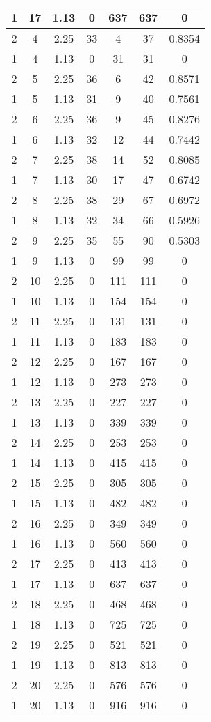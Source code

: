 \documentclass[letterpaper, 12pt]{article}
\begin{document}
\begin{longtable}{|c|c|c|c|c|c|c|}
1 & 17 & 1.13 & 0 & 637 & 637 & 0 \\
\hline
2 & 4 & 2.25 & 33 & 4 & 37 & 0.8354 \\
\hline
1 & 4 & 1.13 & 0 & 31 & 31 & 0 \\
\hline
2 & 5 & 2.25 & 36 & 6 & 42 & 0.8571 \\
\hline
1 & 5 & 1.13 & 31 & 9 & 40 & 0.7561 \\
\hline
2 & 6 & 2.25 & 36 & 9 & 45 & 0.8276 \\
\hline
1 & 6 & 1.13 & 32 & 12 & 44 & 0.7442 \\
\hline
2 & 7 & 2.25 & 38 & 14 & 52 & 0.8085 \\
\hline
1 & 7 & 1.13 & 30 & 17 & 47 & 0.6742 \\
\hline
2 & 8 & 2.25 & 38 & 29 & 67 & 0.6972 \\
\hline
1 & 8 & 1.13 & 32 & 34 & 66 & 0.5926 \\
\hline
2 & 9 & 2.25 & 35 & 55 & 90 & 0.5303 \\
\hline
1 & 9 & 1.13 & 0 & 99 & 99 & 0 \\
\hline
2 & 10 & 2.25 & 0 & 111 & 111 & 0 \\
\hline
1 & 10 & 1.13 & 0 & 154 & 154 & 0 \\
\hline
2 & 11 & 2.25 & 0 & 131 & 131 & 0 \\
\hline
1 & 11 & 1.13 & 0 & 183 & 183 & 0 \\
\hline
2 & 12 & 2.25 & 0 & 167 & 167 & 0 \\
\hline
1 & 12 & 1.13 & 0 & 273 & 273 & 0 \\
\hline
2 & 13 & 2.25 & 0 & 227 & 227 & 0 \\
\hline
1 & 13 & 1.13 & 0 & 339 & 339 & 0 \\
\hline
2 & 14 & 2.25 & 0 & 253 & 253 & 0 \\
\hline
1 & 14 & 1.13 & 0 & 415 & 415 & 0 \\
\hline
2 & 15 & 2.25 & 0 & 305 & 305 & 0 \\
\hline
1 & 15 & 1.13 & 0 & 482 & 482 & 0 \\
\hline
2 & 16 & 2.25 & 0 & 349 & 349 & 0 \\
\hline
1 & 16 & 1.13 & 0 & 560 & 560 & 0 \\
\hline
2 & 17 & 2.25 & 0 & 413 & 413 & 0 \\
\hline
1 & 17 & 1.13 & 0 & 637 & 637 & 0 \\
\hline
2 & 18 & 2.25 & 0 & 468 & 468 & 0 \\
\hline
1 & 18 & 1.13 & 0 & 725 & 725 & 0 \\
\hline
2 & 19 & 2.25 & 0 & 521 & 521 & 0 \\
\hline
1 & 19 & 1.13 & 0 & 813 & 813 & 0 \\
\hline
2 & 20 & 2.25 & 0 & 576 & 576 & 0 \\
\hline
1 & 20 & 1.13 & 0 & 916 & 916 & 0 \\
\hline
\end{longtable}
\end{document}

